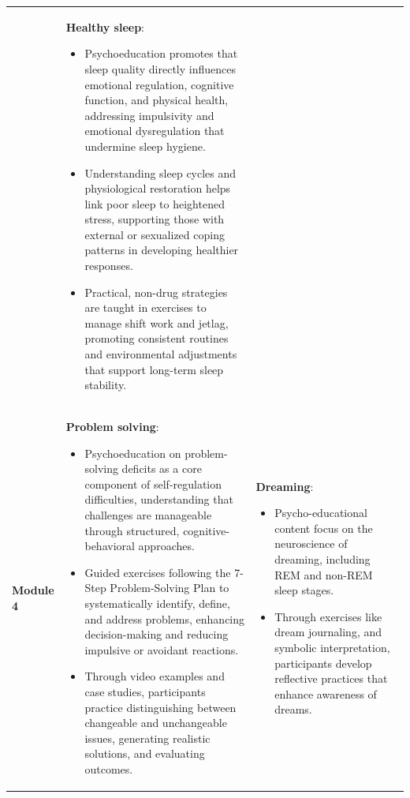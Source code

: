\documentclass[
  super,
  preprint,
  1p,
  onecolumn]{elsarticle}
\begin{document}
\begin{table}
{\begin{tabular*}{\linewidth}{@{\extracolsep{\fill}}lll}
\begin{itemize}
\end{itemize} & \textbf{Healthy sleep}:

\begin{itemize}
\item Psychoeducation promotes that sleep quality directly influences emotional regulation, cognitive function, and physical health, addressing impulsivity and emotional dysregulation that undermine sleep hygiene.

\item Understanding sleep cycles and physiological restoration helps link poor sleep to heightened stress, supporting those with external or sexualized coping patterns in developing healthier responses.

\item Practical, non-drug strategies are taught in exercises to manage shift work and jetlag, promoting consistent routines and environmental adjustments that support long-term sleep stability.

\end{itemize} \\ 
\textbf{Module 4} & \textbf{Problem solving}:

\begin{itemize}
\item Psychoeducation on problem-solving deficits as a core component of self-regulation difficulties, understanding that challenges are manageable through structured, cognitive-behavioral approaches.

\item Guided exercises following the 7-Step Problem-Solving Plan to systematically identify, define, and address problems, enhancing decision-making and reducing impulsive or avoidant reactions.

\item Through video examples and case studies, participants practice distinguishing between changeable and unchangeable issues, generating realistic solutions, and evaluating outcomes.

\end{itemize} & \textbf{Dreaming}:

\begin{itemize}
\item Psycho-educational content focus on the neuroscience of dreaming, including REM and non-REM sleep stages.

\item Through exercises like dream journaling, and symbolic interpretation, participants develop reflective practices that enhance awareness of dreams.


\end{itemize}
\end{tabular*}}
\end{table}
\end{document}
